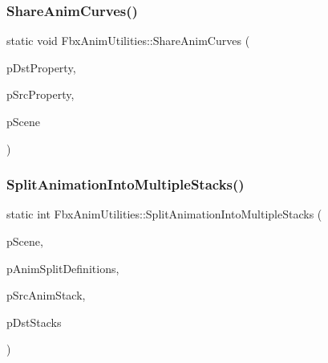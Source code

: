 \subsubsection{\texorpdfstring{Share\+Anim\+Curves()}{ShareAnimCurves()}}
{\footnotesize\ttfamily static void Fbx\+Anim\+Utilities\+::\+Share\+Anim\+Curves (\begin{DoxyParamCaption}\item[{\hyperlink{class_fbx_property}{Fbx\+Property} \&}]{p\+Dst\+Property,  }\item[{\hyperlink{class_fbx_property}{Fbx\+Property} \&}]{p\+Src\+Property,  }\item[{\hyperlink{class_fbx_scene}{Fbx\+Scene} $\ast$}]{p\+Scene }\end{DoxyParamCaption})\hspace{0.3cm}{\ttfamily [static]}}

\mbox{\label{class_fbx_anim_utilities_a74a095d049f34889da64d01f58863b66}} 
\subsubsection{\texorpdfstring{Split\+Animation\+Into\+Multiple\+Stacks()}{SplitAnimationIntoMultipleStacks()}}
{\footnotesize\ttfamily static int Fbx\+Anim\+Utilities\+::\+Split\+Animation\+Into\+Multiple\+Stacks (\begin{DoxyParamCaption}\item[{\hyperlink{class_fbx_scene}{Fbx\+Scene} $\ast$}]{p\+Scene,  }\item[{const \hyperlink{class_fbx_array}{Fbx\+Array}$<$ \hyperlink{class_fbx_anim_utilities_1_1_fbx_anim_split_def}{Fbx\+Anim\+Split\+Def} $\ast$$>$ \&}]{p\+Anim\+Split\+Definitions,  }\item[{const \hyperlink{class_fbx_anim_stack}{Fbx\+Anim\+Stack} $\ast$}]{p\+Src\+Anim\+Stack,  }\item[{\hyperlink{class_fbx_array}{Fbx\+Array}$<$ \hyperlink{class_fbx_anim_stack}{Fbx\+Anim\+Stack} $\ast$$>$ \&}]{p\+Dst\+Stacks }\end{DoxyParamCaption})\hspace{0.3cm}{\ttfamily [static]}}

\mbox{\label{class_fbx_anim_utilities_a85a425cdc6787b10cd6c6f05d23e2b51}} 
